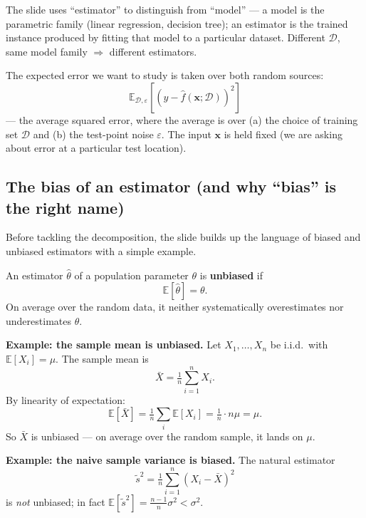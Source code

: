 \documentclass[11pt, a4paper]{article}
\begin{document}
\begin{pitfallbox}
The slide uses ``estimator'' to distinguish from ``model'' — a model is the parametric family (linear regression, decision tree); an estimator is the trained instance produced by fitting that model to a particular dataset. Different $\mathcal{D}$, same model family $\Rightarrow$ different estimators.
\end{pitfallbox}

The expected error we want to study is taken over both random sources:
\[
\mathbb{E}_{\mathcal{D}, \varepsilon}\!\left[(y - \hat{f}(\mathbf{x}; \mathcal{D}))^2\right]
\]
— the average squared error, where the average is over (a) the choice of training set $\mathcal{D}$ and (b) the test-point noise $\varepsilon$. The input $\mathbf{x}$ is held fixed (we are asking about error at a particular test location).

\subsection{The bias of an estimator (and why ``bias'' is the right name)}

Before tackling the decomposition, the slide builds up the language of biased and unbiased estimators with a simple example.

\begin{defbox}
An estimator $\hat\theta$ of a population parameter $\theta$ is \textbf{unbiased} if
\[
\mathbb{E}[\hat\theta] = \theta.
\]
On average over the random data, it neither systematically overestimates nor underestimates $\theta$.
\end{defbox}

\textbf{Example: the sample mean is unbiased.} Let $X_1, \ldots, X_n$ be i.i.d.\ with $\mathbb{E}[X_i] = \mu$. The sample mean is
\[
\bar X = \tfrac{1}{n}\sum_{i=1}^n X_i.
\]
By linearity of expectation:
\[
\mathbb{E}[\bar X] = \tfrac{1}{n}\sum_i \mathbb{E}[X_i] = \tfrac{1}{n}\cdot n\mu = \mu.
\]
So $\bar X$ is unbiased — on average over the random sample, it lands on $\mu$.

\textbf{Example: the naive sample variance is biased.} The natural estimator
\[
\tilde s^2 = \tfrac{1}{n}\sum_{i=1}^n (X_i - \bar X)^2
\]
is \emph{not} unbiased; in fact $\mathbb{E}[\tilde s^2] = \tfrac{n-1}{n}\sigma^2 < \sigma^2$.
\end{document}
